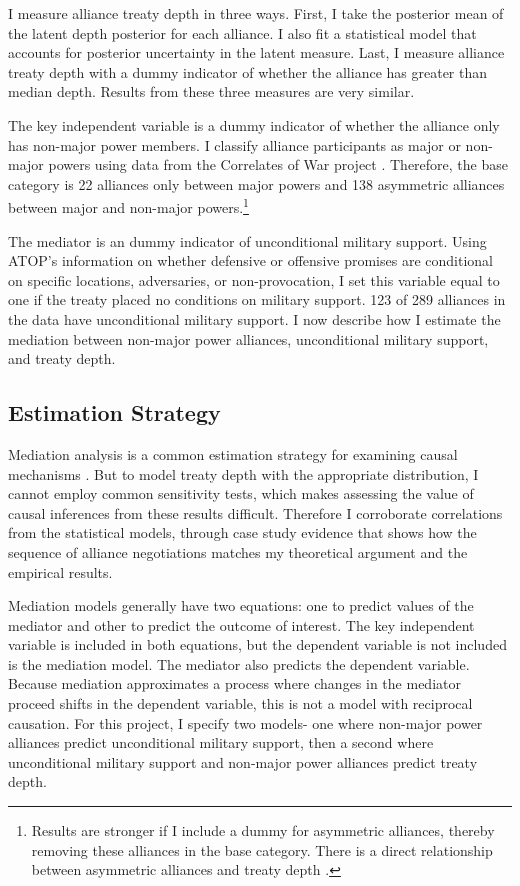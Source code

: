 \documentclass[12pt]{article}
\begin{document}
I measure alliance treaty depth in three ways.
First, I take the posterior mean of the latent depth posterior for each alliance. 
I also fit a statistical model that accounts for posterior uncertainty in the latent measure. 
Last, I measure alliance treaty depth with a dummy indicator of whether the alliance has greater than median depth. 
Results from these three measures are very similar. 


The key independent variable is a dummy indicator of whether the alliance only has non-major power members. 
I classify alliance participants as major or non-major powers using data from the Correlates of War project \citep{SingerCINC1988}.
Therefore, the base category is 22 alliances only between major powers and 138 asymmetric alliances between major and non-major powers.\footnote{Results are stronger if I include a dummy for asymmetric alliances, thereby removing these alliances in the base category. There is a direct relationship between asymmetric alliances and treaty depth \citep{Mattes2012}.}  


The mediator is an dummy indicator of unconditional military support. 
Using ATOP's information on whether defensive or offensive promises are conditional on specific locations, adversaries, or non-provocation, I set this variable equal to one if the treaty placed no conditions on military support.
123 of 289 alliances in the data have unconditional military support. 
I now describe how I estimate the mediation between non-major power alliances, unconditional military support, and treaty depth. 


\subsection{Estimation Strategy}

Mediation analysis is a common estimation strategy for examining causal mechanisms \citep{Imaietal2011}. 
But to model treaty depth with the appropriate distribution, I cannot employ common sensitivity tests, which makes assessing the value of causal inferences from these results difficult. 
Therefore I corroborate correlations from the statistical models, through case study evidence that shows how the sequence of alliance negotiations matches my theoretical argument and the empirical results. 


Mediation models generally have two equations: one to predict values of the mediator and other to predict the outcome of interest. 
The key independent variable is included in both equations, but the dependent variable is not included is the mediation model. 
The mediator also predicts the dependent variable. 
Because mediation approximates a process where changes in the mediator proceed shifts in the dependent variable, this is not a model with reciprocal causation. 
For this project, I specify two models- one where non-major power alliances predict unconditional military support, then a second where unconditional military support and non-major power alliances predict treaty depth. 
\end{document}
